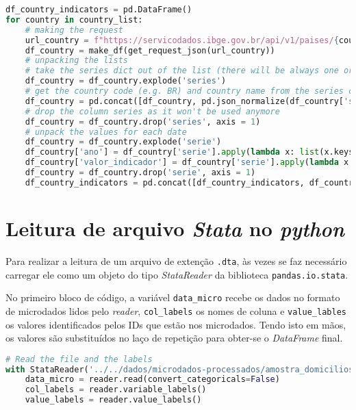\begin{apendicesenv}
\begin{lstlisting}[label={lst:api-paises},language=Python, caption=\textit{Script} de carga dos indicadores da API de países.]
df_country_indicators = pd.DataFrame()
for country in country_list:
    # making the request
    url_country = f"https://servicodados.ibge.gov.br/api/v1/paises/{country}/indicadores"
    df_country = make_df(get_request_json(url_country))
    # unpacking the lists
    # take the series dict out of the list (there will be always one or zero values on the list)
    df_country = df_country.explode('series')
    # get the country code (e.g. BR) and country name from the series country and concat it into each of the df_country lines
    df_country = pd.concat([df_country, pd.json_normalize(df_country['series'])], axis = 1)
    # drop the column series as it won't be used anymore
    df_country = df_country.drop('series', axis = 1)
    # unpack the values for each date
    df_country = df_country.explode('serie')
    df_country['ano'] = df_country['serie'].apply(lambda x: list(x.keys())[0] if type(x) == dict else None)
    df_country['valor_indicador'] = df_country['serie'].apply(lambda x: list(x.values())[0] if type(x) == dict else None)
    df_country = df_country.drop('serie', axis = 1)
    df_country_indicators = pd.concat([df_country_indicators, df_country], ignore_index=True)
\end{lstlisting}

\section{Leitura de arquivo \textit{Stata} no \textit{python}}

    Para realizar a leitura de um arquivo de extenção \verb|.dta|, às vezes se faz necessário carregar ele como um objeto do tipo \textit{StataReader} da biblioteca \verb|pandas.io.stata|. 

    No primeiro bloco de código, a variável \verb|data_micro| recebe os dados no formato de microdados lidos pelo \textit{reader}, \verb|col_labels| os nomes de coluna e \verb|value_lables| os valores identificados pelos IDs que estão nos microdados. Tendo isto em mãos, os valores são substituídos no laço de repetição para obter-se o \textit{DataFrame} final.

\begin{lstlisting}[label={lst:read-stata},language=Python, caption=\textit{Script} de carga dos indicadores da API de países.]
# Read the file and the labels
with StataReader('../../dados/microdados-processados/amostra_domicilios_2010_RJ.dta') as reader:
    data_micro = reader.read(convert_categoricals=False)
    col_labels = reader.variable_labels()
    value_labels = reader.value_labels()


\end{lstlisting}
\end{apendicesenv}
